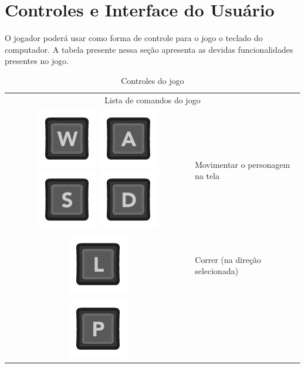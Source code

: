 \documentclass[12pt]{article}
\begin{document}
\section{Controles e Interface do Usuário}
O jogador poderá usar como forma de controle para o jogo o teclado do computador. A tabela presente nessa seção apresenta as devidas funcionalidades presentes no jogo.

\begin{longtable}{|c|p{10cm}|}
\caption{Controles do jogo}
\onehalfspacing
\\
\hline
\multicolumn{2}{|c|}{Lista de comandos do jogo}
\\
\hline
\includegraphics[scale=0.3]{images/kW.png} 
\includegraphics[scale=0.3]{images/kA.png}
\includegraphics[scale=0.3]{images/kS.png}
\includegraphics[scale=0.3]{images/kD.png}
& Movimentar o personagem na tela
\\
\hline
\includegraphics[scale=0.3]{images/kL.png}
 & Correr (na direção selecionada)
\\
\hline
\includegraphics[scale=0.3]{images/kP.png}

\end{longtable}
\end{document}
